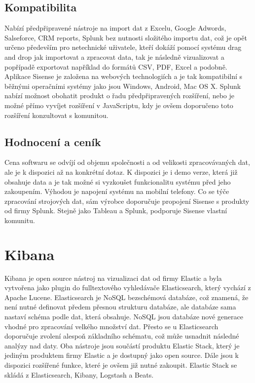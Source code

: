 \documentclass[czech,BP]{thesiskiv}
\begin{document}
 \subsection{Kompatibilita}
  Nabízí předpřipravené nástroje na import dat z Excelu, Google Adwords, Salseforce, CRM reports, Splunk bez nutnosti složitého importu dat, což je opět určeno především pro netechnické uživatele, kteří dokáží pomocí systému drag and drop jak importovat a zpracovat data, tak je následně vizualizovat a popřípadě exportovat například do formátů CSV, PDF, Excel a podobně. \cite{PDF} Aplikace Sisense je založena na webových technologiích a je tak kompatibilní s běžnými operačními systémy jako jsou Windows, Android, Mac OS X. Splunk nabízí možnost obohatit produkt o řadu předpřipravených rozšíření, nebo je možné  přímo vyvíjet rozšíření v JavaScriptu, kdy je ovšem doporučeno toto rozšíření konzultovat s komunitou.\cite{SisenseAdd-ons}
 \subsection{Hodnocení a ceník}
 Cena softwaru se odvíjí od objemu společnosti a od velikosti zpracovávaných dat, ale je k dispozici až na konkrétní dotaz. K dispozici je i demo verze, která již obsahuje data a je tak možné si vyzkoušet funkcionalitu systému před jeho zakoupením. Výhodou je napojení systému na mobilní telefony. Co se týče zpracování strojových dat, sám výrobce doporučuje propojení Sisense s produkty od firmy Splunk. Stejně jako Tableau a Splunk, podporuje Sisense vlastní komunitu.\cite{SisenseAndSplunk}
 
 
 
 \section{Kibana}
 Kibana je open source nástroj na vizualizaci dat od firmy Elastic a byla vytvořena jako plugin do fulltextového vyhledávače Elasticsearch, který vychází z Apache Lucene. Elasticsearch je NoSQL bezschémová databáze, což znamená, že není nutné definovat předem přesnou strukturu databáze, ale databáze sama nastaví schéma podle dat, která obsahuje. NoSQL jsou databáze nové generace vhodné pro zpracování velkého množství dat.\cite{NoSQL} Přesto se u Elasticsearch doporučuje zvolení alespoň základního schématu, což může usnadnit následné analýzy nad daty.\cite{SchemaElastic} Oba nástroje jsou součástí produktu Elastic Stack, který je jediným produktem firmy Elastic a je dostupný jako open source. Dále jsou k  dispozici rozšířené funkce, které je ovšem již nutné zakoupit. Elastic Stack se skládá z Elasticsearch, Kibany, Logstash a Beats.
 
\end{document}
